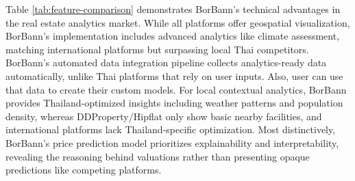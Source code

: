 \begin{table}[htbp]
\centering
\renewcommand{\arraystretch}{1.3}
\caption{Feature Comparison: BorBann vs Other Platforms}
\label{tab:feature-comparison}
\end{table}

Table \ref{tab:feature-comparison} demonstrates BorBann's technical advantages in the real estate analytics market. While all platforms offer geospatial visualization,
 BorBann's implementation includes advanced analytics like climate assessment, matching international platforms but surpassing local Thai competitors.
  BorBann's automated data integration pipeline collects analytics-ready data automatically, unlike Thai platforms that rely on user inputs. Also, user can use that data to create their custom models.
   For local contextual analytics, BorBann provides Thailand-optimized insights including weather patterns and population density,
    whereas DDProperty/Hipflat only show basic nearby facilities, and international platforms lack Thailand-specific optimization.
     Most distinctively, BorBann's price prediction model prioritizes explainability and interpretability,
      revealing the reasoning behind valuations rather than presenting opaque predictions like competing platforms.


